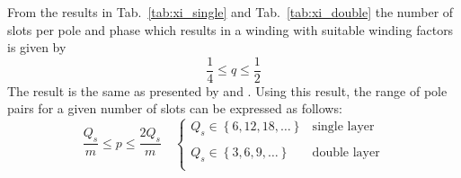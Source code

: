 From the results in Tab.~\ref{tab:xi_single} and Tab.~\ref{tab:xi_double} the number of slots per pole and phase which results in a winding with suitable winding factors is given by
\begin{equation}
  \frac{1}{4} \leq q \leq \frac{1}{2}
\end{equation}
The result is the same as presented by \cite{REF-00754} and \cite{REF-00756}. Using this result, the range of pole pairs for a given number of slots can be expressed as follows:
\begin{equation}
  \frac{Q_s}{m} \leq p \leq \frac{2Q_s}{m}
  \quad
  \left\{
  \begin{array}{ll}
  Q_s \in \left\{6,12,18,\ldots\right\} & \mbox{single layer}\\
  \:  & \: \\
  Q_s \in \left\{3,6,9,\ldots\right\} & \mbox{double layer}\\
  \end{array}
  \right.
\end{equation} 

